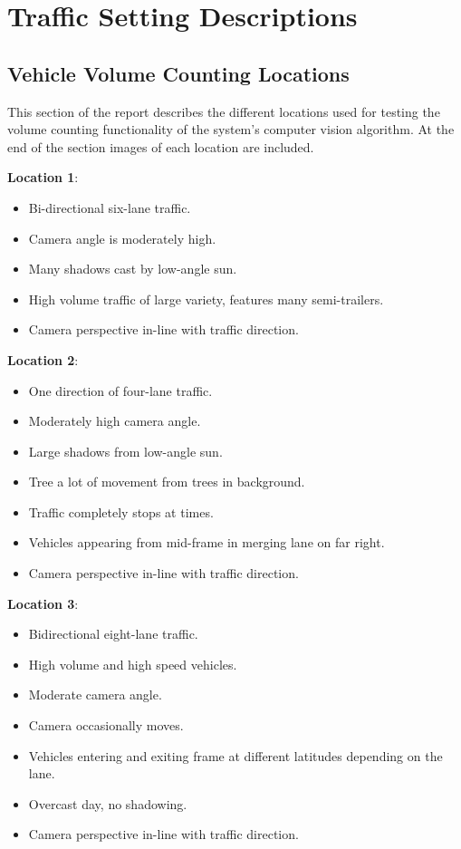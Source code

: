 \chapter{Traffic Setting Descriptions}

\section{Vehicle Volume Counting Locations}
\label{section:traffic_descriptors}

This section of the report describes the different locations used for testing the volume counting functionality of the system's computer vision algorithm. At the end of the section images of each location are included.

\textbf{Location 1}: 

\begin{itemize}
    \item Bi-directional six-lane traffic.
    \item Camera angle is moderately high. 
    \item Many shadows cast by low-angle sun.
    \item High volume traffic of large variety, features many semi-trailers. 
    \item Camera perspective in-line with traffic direction.
\end{itemize}
 

\textbf{Location 2}:

\begin{itemize}
    \item One direction of four-lane traffic.
    \item Moderately high camera angle.
    \item Large shadows from low-angle sun.
    \item Tree a lot of movement from trees in background.
    \item Traffic completely stops at times.
    \item Vehicles appearing from mid-frame in merging lane on far right.
    \item Camera perspective in-line with traffic direction.
\end{itemize}


\textbf{Location 3}: 

\begin{itemize}
    \item Bidirectional eight-lane traffic.
    \item High volume and high speed vehicles.
    \item Moderate camera angle.
    \item Camera occasionally moves.
    \item Vehicles entering and exiting frame at different latitudes depending on the lane.
    \item Overcast day, no shadowing. 
    \item Camera perspective in-line with traffic direction.
\end{itemize}


